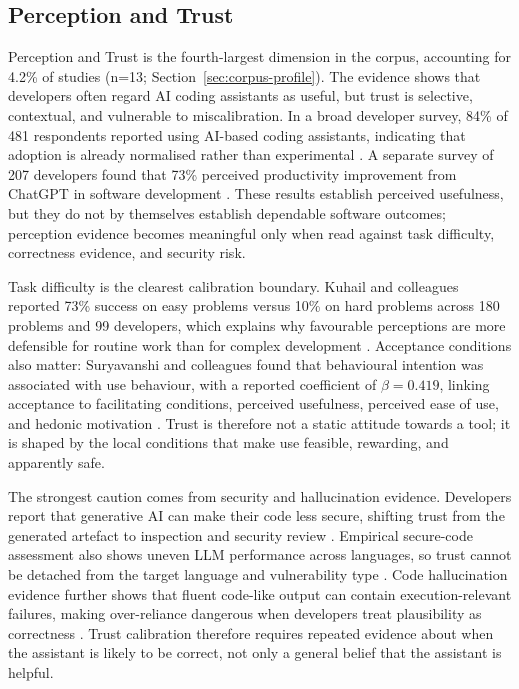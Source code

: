 \subsection{Perception and Trust}
\label{sec:perception-trust}
Perception and Trust is the fourth-largest dimension in the corpus, accounting for 4.2\% of studies (n=13; Section~\ref{sec:corpus-profile}). The evidence shows that developers often regard AI coding assistants as useful, but trust is selective, contextual, and vulnerable to miscalibration. In a broad developer survey, 84\% of 481 respondents reported using AI-based coding assistants, indicating that adoption is already normalised rather than experimental \cite{sergeyuk_using_2025}. A separate survey of 207 developers found that 73\% perceived productivity improvement from ChatGPT in software development \cite{vaillant_developers_2024}. These results establish perceived usefulness, but they do not by themselves establish dependable software outcomes; perception evidence becomes meaningful only when read against task difficulty, correctness evidence, and security risk.

Task difficulty is the clearest calibration boundary. Kuhail and colleagues reported 73\% success on easy problems versus 10\% on hard problems across 180 problems and 99 developers, which explains why favourable perceptions are more defensible for routine work than for complex development \cite{kuhail_will_2024}. Acceptance conditions also matter: Suryavanshi and colleagues found that behavioural intention was associated with use behaviour, with a reported coefficient of $\beta=0.419$, linking acceptance to facilitating conditions, perceived usefulness, perceived ease of use, and hedonic motivation \cite{suryavanshi_integrating_2025}. Trust is therefore not a static attitude towards a tool; it is shaped by the local conditions that make use feasible, rewarding, and apparently safe.

The strongest caution comes from security and hallucination evidence. Developers report that generative AI can make their code less secure, shifting trust from the generated artefact to inspection and security review \cite{kudriavtseva_my_2025}. Empirical secure-code assessment also shows uneven LLM performance across languages, so trust cannot be detached from the target language and vulnerability type \cite{dozono_large_2026}. Code hallucination evidence further shows that fluent code-like output can contain execution-relevant failures, making over-reliance dangerous when developers treat plausibility as correctness \cite{tian_codehalu_2025}. Trust calibration therefore requires repeated evidence about when the assistant is likely to be correct, not only a general belief that the assistant is helpful.

